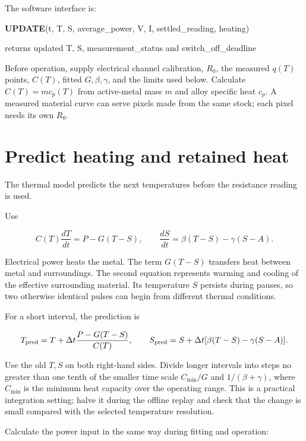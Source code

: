 \documentclass[11pt,letterpaper]{article}
\newenvironment{pseudocode}{\par\begingroup\small\setlength{\parskip}{0.15em}}{\endgroup\par}
\newcommand{\pcstep}[2]{\par\noindent\hspace*{#1em}\parbox[t]{\dimexpr\linewidth-#1em\relax}{\raggedright #2\strut}}
\begin{document}
The software interface is:

\begin{pseudocode}
\pcstep{0.0}{\textbf{UPDATE}(t, T, S, average\_\allowbreak{}power, V, I, settled\_\allowbreak{}reading, heating)}
\pcstep{1.0}{returns updated T, S, measurement\_\allowbreak{}status and switch\_\allowbreak{}off\_\allowbreak{}deadline}
\end{pseudocode}

Before operation, supply electrical channel calibration, \(R_0\), the measured \(q(T)\) points, \(C(T)\), fitted \(G,\beta,\gamma\), and the limits used below. Calculate \(C(T)=m c_p(T)\) from active-metal mass \(m\) and alloy specific heat \(c_p\). A measured material curve can serve pixels made from the same stock; each pixel needs its own \(R_0\).

\section{Predict heating and retained heat}

The thermal model predicts the next temperatures before the resistance reading is used.

Use

\[
C(T)\frac{dT}{dt}=P-G(T-S),\qquad
\frac{dS}{dt}=\beta(T-S)-\gamma(S-A).
\]

Electrical power heats the metal. The term \(G(T-S)\) transfers heat between metal and surroundings. The second equation represents warming and cooling of the effective surrounding material. Its temperature \(S\) persists during pauses, so two otherwise identical pulses can begin from different thermal conditions.

For a short interval, the prediction is

\[
T_{\rm pred}=T+\Delta t\frac{P-G(T-S)}{C(T)},\qquad
S_{\rm pred}=S+\Delta t[\beta(T-S)-\gamma(S-A)].
\]

Use the old \(T,S\) on both right-hand sides. Divide longer intervals into steps no greater than one tenth of the smaller time scale \(C_{\min}/G\) and \(1/(\beta+\gamma)\), where \(C_{\min}\) is the minimum heat capacity over the operating range. This is a practical integration setting; halve it during the offline replay and check that the change is small compared with the selected temperature resolution.

Calculate the power input in the same way during fitting and operation:
\end{document}
